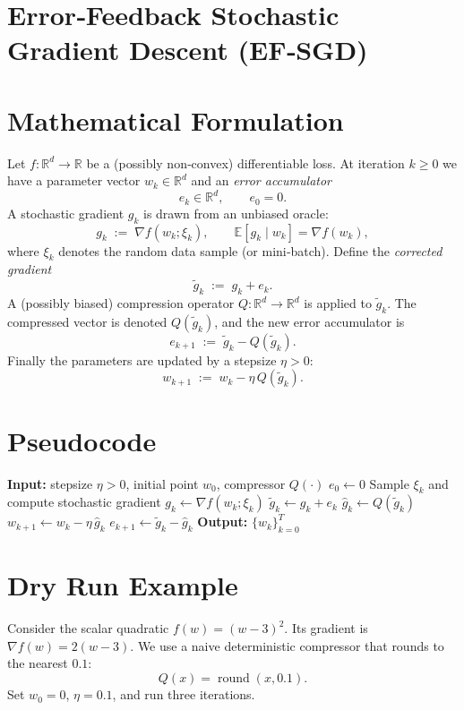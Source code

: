 \documentclass[11pt]{article}
\newcommand{\E}{\mathbb{E}}
\newcommand{\R}{\mathbb{R}}
\begin{document}
\section*{Error‑Feedback Stochastic Gradient Descent (EF‑SGD)}

\section*{Mathematical Formulation}
Let $f:\R^{d}\rightarrow\R$ be a (possibly non‑convex) differentiable loss.  
At iteration $k\ge 0$ we have a parameter vector $w_{k}\in\R^{d}$ and an \emph{error accumulator}
\[
e_{k}\in\R^{d},\qquad e_{0}=0.
\]
A stochastic gradient $g_{k}$ is drawn from an unbiased oracle:
\[
g_{k}\;:=\;\nabla f(w_{k};\xi_{k}),\qquad 
\E\!\left[g_{k}\mid w_{k}\right]=\nabla f(w_{k}),
\]
where $\xi_{k}$ denotes the random data sample (or mini‑batch).  
Define the \emph{corrected gradient}
\[
\tilde g_{k}\;:=\;g_{k}+e_{k}.
\]
A (possibly biased) compression operator $Q:\R^{d}\rightarrow\R^{d}$ is applied to $\tilde g_{k}$.
The compressed vector is denoted $Q(\tilde g_{k})$, and the new error accumulator is
\[
e_{k+1}\;:=\;\tilde g_{k}-Q(\tilde g_{k}). \tag{1}
\]
Finally the parameters are updated by a stepsize $\eta>0$:
\[
w_{k+1}\;:=\;w_{k}-\eta\,Q(\tilde g_{k}). \tag{2}
\]

\section*{Pseudocode}
\begin{algorithm}[H]
\caption{EF‑SGD}
\begin{algorithmic}[1]
\STATE \textbf{Input:} stepsize $\eta>0$, initial point $w_{0}$, compressor $Q(\cdot)$
\STATE $e_{0}\gets 0$
    \STATE Sample $\xi_{k}$ and compute stochastic gradient $g_{k}\gets\nabla f(w_{k};\xi_{k})$
    \STATE $\tilde g_{k}\gets g_{k}+e_{k}$                     
    \STATE $\hat g_{k}\gets Q(\tilde g_{k})$                  
    \STATE $w_{k+1}\gets w_{k}-\eta\,\hat g_{k}$              
    \STATE $e_{k+1}\gets \tilde g_{k}-\hat g_{k}$              
\ENDFOR
\STATE \textbf{Output:} $\{w_{k}\}_{k=0}^{T}$
\end{algorithmic}
\end{algorithm}

\section*{Dry Run Example}
Consider the scalar quadratic $f(w)=(w-3)^{2}$.  
Its gradient is $\nabla f(w)=2(w-3)$.  
We use a naive deterministic compressor that rounds to the nearest $0.1$:
\[
Q(x)=\operatorname{round}(x,0.1).
\]
Set $w_{0}=0$, $\eta=0.1$, and run three iterations.
\end{document}
